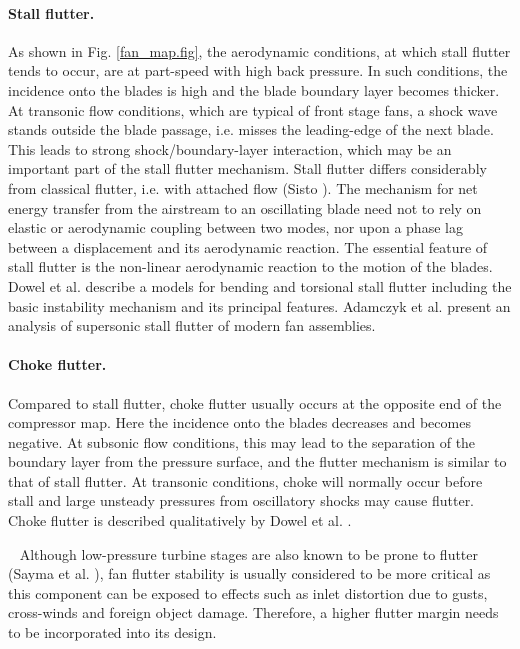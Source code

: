 \paragraph{Stall flutter.}
%
 As shown in Fig. \ref{fan_map.fig}, the aerodynamic conditions,
 at which stall flutter tends to occur, are at part-speed with high
 back pressure.
 In such conditions, the incidence onto the blades is high and the
 blade boundary layer becomes thicker. At transonic
 flow conditions, which are typical of front stage fans,
 a shock wave stands outside the blade passage, i.e. misses the
 leading-edge of the next blade.
 This leads to strong shock/boundary-layer interaction, which may be an
 important part of the stall flutter mechanism.
 Stall flutter differs considerably from classical flutter,
 i.e. with attached flow (Sisto ).
 The mechanism for net energy transfer from the airstream to an oscillating
 blade need not to rely on elastic or aerodynamic coupling between two modes,
 nor upon a phase lag between a displacement and its aerodynamic reaction.
 The essential feature of stall flutter is the non-linear aerodynamic
 reaction to the motion of the blades.
 Dowel et al. \citeyear{Sisto:3} describe a models for bending and torsional
 stall flutter including the basic instability mechanism and its principal
 features.
 Adamczyk et al. \citeyear{Adamczyk:1} present an analysis of supersonic stall
 flutter of modern fan assemblies.
%
%
%
\paragraph{Choke flutter.}
%
 Compared to stall flutter, choke flutter usually occurs at the opposite
 end of the compressor map. Here the incidence onto the blades decreases
 and becomes negative.
 At subsonic flow conditions, this may lead to the separation of the
 boundary layer from the pressure surface, and the flutter mechanism
 is similar to that of stall flutter. At transonic conditions, choke
 will normally occur before stall and large unsteady pressures
 from oscillatory shocks may cause flutter.
 Choke flutter is described qualitatively by Dowel et al. \citeyear{Sisto:3}.

~\newline
 Although low-pressure turbine stages are also known to be prone to flutter
 (Sayma et al. ), fan flutter
 stability is usually considered to be more critical as this component can be
 exposed to effects such as inlet distortion due to gusts, cross-winds and
 foreign object damage. Therefore, a higher flutter margin needs to be
 incorporated into its design.
%
%
%
%

